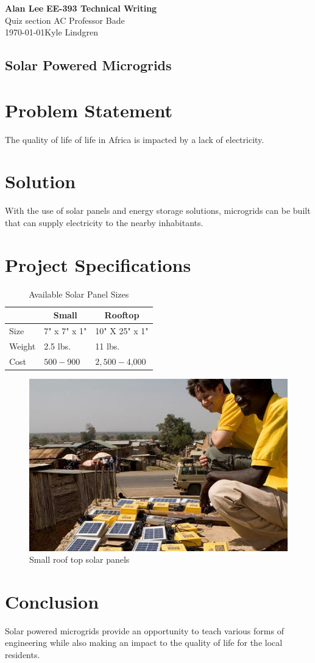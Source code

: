 \documentclass[11pt]{article}
\begin{document}
% 
\noindent
\Large \textbf{Alan Lee} \hfill 
\Large \textbf {EE-393 Technical Writing} \\
Quiz section AC \hfill Professor Bade \\
\today \hfill Kyle Lindgren

\begin{center}
\section*{Solar Powered Microgrids}
\end{center}

\section*{Problem Statement}
The quality of life of life in Africa is impacted by a lack of electricity. 

\section*{Solution}
With the use of solar panels and energy storage solutions, microgrids can be built that can supply electricity to the nearby inhabitants.

\section*{Project Specifications}

\begin{table}[h]
\centering
\caption{Available Solar Panel Sizes}
\label{my-label}
\begin{tabular}{|l|l|l|}
\hline
& \multicolumn{1}{|c|}{Small} & \multicolumn{1}{c|}{Rooftop}  \\ \hline
Size   & 7" x 7" x 1" & 10" X 25" x 1"  \\ \hline
Weight & 2.5 lbs.     & 11 lbs.         \\ \hline
Cost   & $500-$900    & $2,500 - $4,000 \\ \hline
\end{tabular}
\end{table}

\begin{figure}[h]
\centering
\includegraphics[scale = 0.20]{Solar_Panel.jpg}
\caption{Small roof top solar panels}
\end{figure}
\section*{Conclusion}
Solar powered microgrids provide an opportunity to teach various forms of engineering while also making an impact to the quality of life for the local residents.
\end{document}
